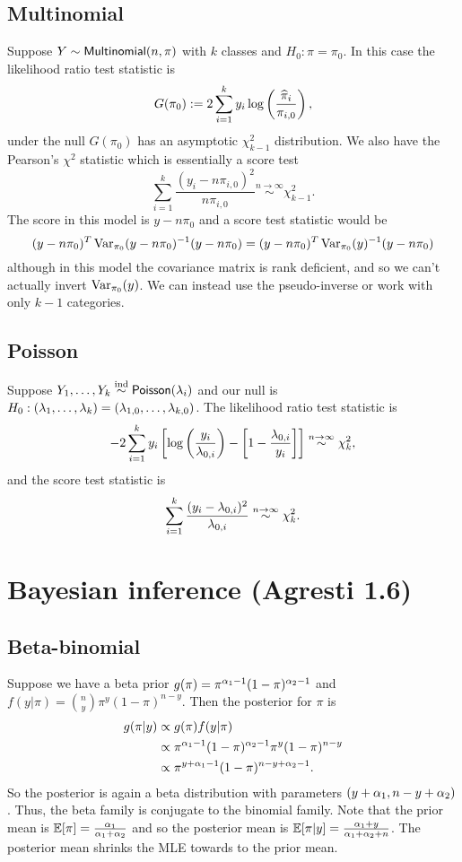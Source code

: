\subsection{Multinomial}
Suppose $Y \sim \mathsf{Multinomial}(n,\pi)$ with $k$ classes and $H_0:\pi=\pi_0$. In this case the likelihood ratio test statistic is
\[G(\pi_0) := 2\sum_{i=1}^k y_i \log\left(\frac{\widehat{\pi}_i}{\pi_{i,0}}\right),\]
under the null $G(\pi_0)$ has an asymptotic $\chi^2_{k-1}$ distribution. We also have the Pearson's $\chi^2$ statistic which is essentially a score test
\[\sum_{i=1}^k \frac{(y_i-n\pi_{i,0})^2}{n\pi_{i,0}} \stackrel{n \to \infty}{\sim} \chi^2_{k-1}.\]
The score in this model is $y - n \pi_0$ and a score test statistic would be \[(y-n\pi_0)^T\operatorname{Var}_{\pi_0}(y-n\pi_0)^{-1}(y-n\pi_0) =(y-n\pi_0)^T\operatorname{Var}_{\pi_0}(y)^{-1}(y-n\pi_0) \] although in this model the covariance matrix is rank deficient, and so we can't actually invert $\operatorname{Var}_{\pi_0}(y)$. We can instead use the pseudo-inverse or work with only $k-1$ categories.
\subsection{Poisson}
Suppose $Y_1,\ldots,Y_k \stackrel{\text{ind}}{\sim} \mathsf{Poisson}(\lambda_i)$ and our null is $H_0:(\lambda_1,\ldots,\lambda_k)=(\lambda_{1,0},\ldots,\lambda_{k,0})$. The likelihood ratio test statistic is
\[-2\sum_{i=1}^k y_i\left[\log\left(\frac{y_i}{\lambda_{0,i}}\right)-\left[1-\frac{\lambda_{0,i}}{y_i}\right]\right] \stackrel{n \to \infty}{\sim} \chi^2_k, \]
and the score test statistic is
\[\sum_{i=1}^k \frac{(y_i-\lambda_{0,i})^2}{\lambda_{0,i}}  \stackrel{n \to \infty}{\sim}\chi^2_k.  \]
\section{Bayesian inference (Agresti 1.6)}
\subsection{Beta-binomial}
Suppose we have a beta prior $g(\pi) = \pi^{{\alpha}_1-1}(1-\pi)^{{\alpha}_2-1}$ and $f(y|\pi) = \binom{n}{y}\pi^y(1-\pi)^{n-y}$. Then the posterior for $\pi$ is
\begin{align*}
    g(\pi|y) &\propto g(\pi)f(y|\pi)\\
    &\propto \pi^{{\alpha}_1-1}(1-\pi)^{{\alpha}_2-1}\pi^y(1-\pi)^{n-y}\\
    &\propto \pi^{y+{\alpha}_1-1}(1-\pi)^{n-y+{\alpha}_2-1}.
\end{align*}
So the posterior is again a beta distribution with parameters $(y+{\alpha}_1, n-y+{\alpha}_2)$. Thus, the beta family is conjugate to the binomial family. Note that the prior mean is ${\mathbb{E}}[\pi] = \frac{{\alpha}_1}{{\alpha}_1+{\alpha}_2}$ and so the posterior mean is ${\mathbb{E}}[\pi|y] = \frac{{\alpha}_1+y}{{\alpha}_1+{\alpha}_2+n}$. The posterior mean shrinks the MLE towards to the prior mean.
